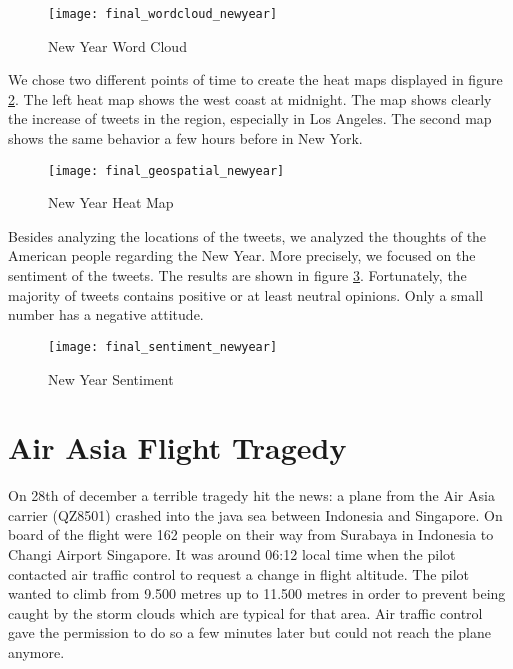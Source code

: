 \begin{figure}[H]
  \centering
        \texttt{[image: final\_wordcloud\_newyear]}
  \caption[New Year Word Cloud]{New Year Word Cloud}
  \label{fig:new-year-word-cloud}
  \vspace{-1.3em}
\end{figure}

We chose two different points of time to create the heat maps displayed in figure \ref{fig:new-year-heat-map}.
The left heat map shows the west coast at midnight. The map shows clearly the increase of tweets in the region, especially in Los Angeles. The second map shows the same behavior a few hours before in New York.

\begin{figure}[H]
  \centering
        \texttt{[image: final\_geospatial\_newyear]}
  \caption[New Year Heat Map]{New Year Heat Map}
  \label{fig:new-year-heat-map}
  \vspace{-1.3em}
\end{figure}

Besides analyzing the locations of the tweets, we analyzed the thoughts of the American people regarding the New Year. More precisely, we focused on the sentiment of the tweets. The results are shown in figure \ref{fig:new-year-sentiment}. Fortunately, the majority of tweets contains positive or at least neutral opinions. Only a small number has a negative attitude.

\begin{figure}[H]
  \centering
        \texttt{[image: final\_sentiment\_newyear]}
  \caption[New Year Sentiment]{New Year Sentiment}
  \label{fig:new-year-sentiment}
  \vspace{-1.3em}
\end{figure}


\section{Air Asia Flight Tragedy}
\label{sec:air-asia-flight-tragedy}
On 28th of december a terrible tragedy hit the news: a plane from the Air Asia carrier (QZ8501) crashed into the java sea between Indonesia and Singapore. On board of the flight were 162 people on their way from Surabaya in Indonesia to Changi Airport Singapore. It was around 06:12 local time when the pilot contacted air traffic control to request a change in flight altitude. The pilot wanted to  climb from 9.500 metres up to 11.500 metres in order to prevent being caught by the storm clouds which are typical for that area. Air traffic control gave the permission to do so a few minutes later but could not reach the plane anymore.\cite{bbc2014flight}

